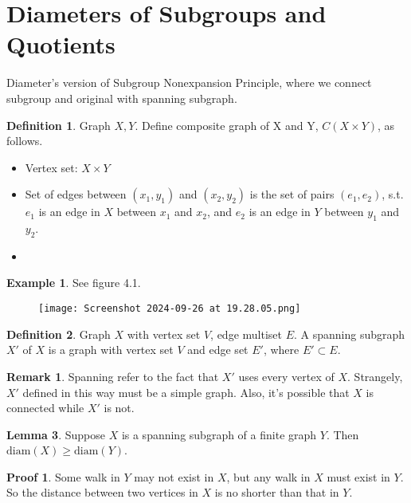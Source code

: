 \documentclass{book}
\newcommand{\diam}[1]{\textrm{diam}( #1 )}
\theoremstyle{definition}
\newtheorem{lemma}{Lemma}[chapter]
\newtheorem{definition}[lemma]{Definition}
\theoremstyle{remarkstyle}
\newtheorem*{remark}{Remark}%
\newtheorem*{example}{Example}%
\newtheorem*{myproof}{Proof}%
\begin{document}
\section{Diameters of Subgroups and Quotients}
Diameter's version of Subgroup Nonexpansion Principle, where we connect subgroup and original with spanning subgraph. \newline

\begin{definition}
    Graph $X,Y$. Define composite graph of X and Y, $C(X \times Y)$, as follows.
    \begin{itemize}
        \item Vertex set: $X\times Y$
        \item Set of edges between $(x_{1}, y_{1}) $ and $(x_{2}, y_{2}) $ is the set of pairs $(e_{1},e_{2}) $, s.t. $e_{1} $ is an edge in $X$ between $x_{1}$ and $x_{2} $, and $e_{2} $ is an edge in $Y$ between $y_{1}$ and $y_{2} $. 
        \item[] 
    \end{itemize}
\end{definition}

\begin{example}
See figure 4.1.
    \begin{figure}[htbp!]
        \texttt{[image: Screenshot 2024-09-26 at 19.28.05.png]}
        \caption{}
    \end{figure}
    \newline
\end{example}

\begin{definition}
    Graph $X$ with vertex set $V$, edge multiset $E$. A spanning subgraph $X'$ of $X$ is a graph with vertex set $V$ and edge set $E'$, where $E' \subset E$.
\end{definition}
\begin{remark}
    Spanning refer to the fact that $X'$ uses every vertex of $X$. Strangely, $X'$ defined in this way must be a simple graph. Also, it's possible that $X$ is connected while $X'$ is not. \newline
\end{remark}


\begin{lemma}
    Suppose $X$ is a spanning subgraph of a finite graph $Y$. Then $\diam{X}\ge \diam{Y}$.
\end{lemma}
\begin{myproof}
    Some walk in $Y$ may not exist in $X$, but any walk in $X$ must exist in $Y$. So the distance between two vertices in $X$ is no shorter than that in $Y$. \newline
\end{myproof}
\end{document}
